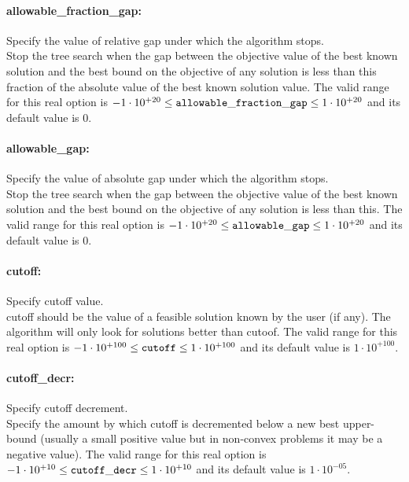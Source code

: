\paragraph{allowable\_fraction\_gap:}\label{sec:allowable_fraction_gap} Specify the value of relative gap under which the algorithm stops. $\;$ \\
 Stop the tree search when the gap between the
objective value of the best known solution and
the best bound on the objective of any solution
is less than this fraction of the absolute value
of the best known solution value. The valid range for this real option is 
$-1 \cdot 10^{+20} \le {\tt allowable\_fraction\_gap } \le 1 \cdot 10^{+20}$
and its default value is $0$.


\paragraph{allowable\_gap:}\label{sec:allowable_gap} Specify the value of absolute gap under which the algorithm stops. $\;$ \\
 Stop the tree search when the gap between the
objective value of the best known solution and
the best bound on the objective of any solution
is less than this. The valid range for this real option is 
$-1 \cdot 10^{+20} \le {\tt allowable\_gap } \le 1 \cdot 10^{+20}$
and its default value is $0$.


\paragraph{cutoff:}\label{sec:cutoff} Specify cutoff value. $\;$ \\
 cutoff should be the value of a feasible solution
known by the user (if any). The algorithm will
only look for solutions better than cutoof. The valid range for this real option is 
$-1 \cdot 10^{+100} \le {\tt cutoff } \le 1 \cdot 10^{+100}$
and its default value is $1 \cdot 10^{+100}$.


\paragraph{cutoff\_decr:}\label{sec:cutoff_decr} Specify cutoff decrement. $\;$ \\
 Specify the amount by which cutoff is decremented
below a new best upper-bound (usually a small
positive value but in non-convex problems it may
be a negative value). The valid range for this real option is 
$-1 \cdot 10^{+10} \le {\tt cutoff\_decr } \le 1 \cdot 10^{+10}$
and its default value is $1 \cdot 10^{-05}$.


